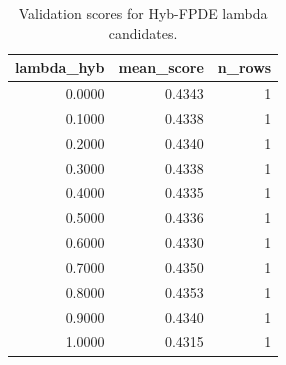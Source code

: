 \begin{table}[t]
\caption{Validation scores for Hyb-FPDE lambda candidates.}
\label{tab:lambda_distribution_computed}
\centering
\begin{tabular}{rrr}
\toprule
lambda\_hyb & mean\_score & n\_rows \\
\midrule
0.0000 & 0.4343 & 1 \\
0.1000 & 0.4338 & 1 \\
0.2000 & 0.4340 & 1 \\
0.3000 & 0.4338 & 1 \\
0.4000 & 0.4335 & 1 \\
0.5000 & 0.4336 & 1 \\
0.6000 & 0.4330 & 1 \\
0.7000 & 0.4350 & 1 \\
0.8000 & 0.4353 & 1 \\
0.9000 & 0.4340 & 1 \\
1.0000 & 0.4315 & 1 \\
\bottomrule
\end{tabular}

\end{table}
